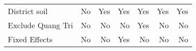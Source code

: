 \begin{table}[htbp]
\begin{tabular}{l*{6}{D{.}{.}{-1}}}
District soil       &          No         &         Yes         &         Yes         &         Yes         &         Yes         &         Yes         \\
Exclude Quang Tri   &          No         &          No         &          No         &         Yes         &          No         &          No         \\
Fixed Effects       &          No         &          No         &         Yes         &          No         &          No         &          No         \\
\bottomrule
\end{tabular}
\end{table}
